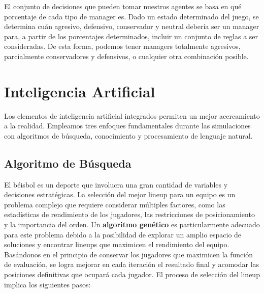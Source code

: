 \documentclass[runningheads]{llncs}
\begin{document}
        El conjunto de decisiones que pueden tomar nuestros agentes se basa en qué porcentaje de cada tipo de manager es. Dado un estado determinado del juego, se determina cuán agresivo, defensivo, conservador y neutral debería ser un manager para, a partir de los porcentajes determinados, incluir un conjunto de reglas a ser consideradas. De esta forma, podemos tener managers totalmente agresivos, parcialmente conservadores y defensivos, o cualquier otra combinación posible.

\section{Inteligencia Artificial}
    Los elementos de inteligencia artificial integrados permiten un mejor acercamiento a la realidad. Empleamos tres enfoques fundamentales durante las simulaciones con algoritmos de búsqueda, conocimiento y procesamiento de lenguaje natural.

    \subsection{Algoritmo de Búsqueda}

        El béisbol es un deporte que involucra una gran cantidad de variables y decisiones estratégicas. La selección del mejor lineup para un equipo es un problema complejo que requiere considerar múltiples factores, como las estadísticas de rendimiento de los jugadores, las restricciones de posicionamiento y la importancia del orden. Un \textbf{algoritmo genético} es particularmente adecuado para este problema debido a la posibilidad de explorar un amplio espacio de soluciones y encontrar lineups que maximicen el rendimiento del equipo. Basándonos en el principio de conservar los jugadores que maximicen la función de evaluación, se logra mejorar en cada iteración el resultado final y acomodar las posiciones definitivas que ocupará cada jugador. El proceso de selección del lineup implica los siguientes pasos:
\end{document}
